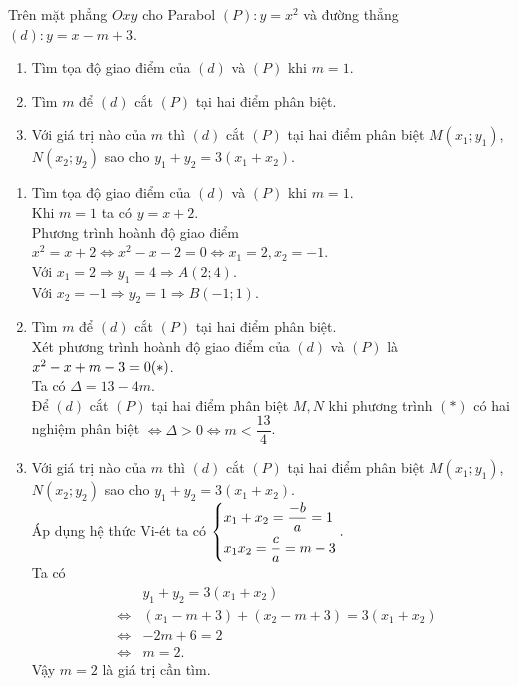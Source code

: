 \begin{ex}%
Trên mặt phẳng $Oxy$ cho Parabol $(P): y=x^2$ và đường thẳng $(d): y=x-m+3$.
\begin{enumerate}
\item Tìm tọa độ giao điểm của $(d)$ và $(P)$ khi $m=1$.
\item Tìm $m$ để $(d)$ cắt $(P)$ tại hai điểm phân biệt.
\item Với giá trị nào của $m$ thì $(d)$ cắt $(P)$ tại hai điểm phân biệt $M(x_1;y_1)$, $N(x_2;y_2)$ sao cho $y_1+y_2=3(x_1+x_2)$.
\end{enumerate}
	\loigiai
	{\begin{enumerate}
\item Tìm tọa độ giao điểm của $(d)$ và $(P)$ khi $m=1$.\\
Khi $m=1$ ta có $y=x+2$.\\
Phương trình hoành độ giao điểm $x^2=x+2 \Leftrightarrow x^2-x-2=0 \Leftrightarrow x_1=2,x_2=-1$.\\
Với $x_1=2 \Rightarrow y_1=4 \Rightarrow A(2;4)$.\\
Với $x_2=-1 \Rightarrow y_2=1 \Rightarrow B(-1;1)$.
\item Tìm $m$ để $(d)$ cắt $(P)$ tại hai điểm phân biệt.\\
Xét phương trình hoành độ giao điểm của $(d)$ và $(P)$ là $x^2-x+m-3=0 \hfill (*)$.\\
Ta có $\Delta=13-4m$.\\
Để $(d)$ cắt $(P)$ tại hai điểm phân biệt $M,N$ khi phương trình $(*)$ có hai nghiệm phân biệt $\Leftrightarrow \Delta >0 \Leftrightarrow m<\dfrac{13}{4}$.
\item Với giá trị nào của $m$ thì $(d)$ cắt $(P)$ tại hai điểm phân biệt $M(x_1;y_1)$, $N(x_2;y_2)$ sao cho $y_1+y_2=3(x_1+x_2)$.\\
Áp dụng hệ thức Vi-ét ta có 
$\left\{\begin{aligned}& x_1+x_2=\dfrac{-b}{a}=1\\&x_1x_2=\dfrac{c}{a}=m-3\end{aligned}\right..$\\
Ta có
\allowdisplaybreaks
 \begin{eqnarray*}
& & y_1+y_2=3(x_1+x_2)\\
&\Leftrightarrow &\left( x_1-m+3\right) + \left( x_2-m+3 \right)=3 \left( x_1+x_2 \right)\\
&\Leftrightarrow & -2m+6=2\\
&\Leftrightarrow & m=2.
\end{eqnarray*}
Vậy $m=2$ là giá trị cần tìm.
\end{enumerate}
}
\end{ex}

